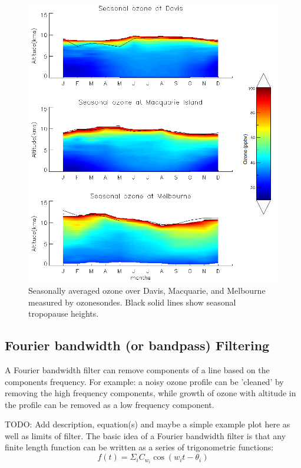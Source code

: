     \begin{figure}\begin{center}
      \includegraphics[width=0.8\columnwidth]{Figures/Ozone/seasonaltropozone}
      \caption{
	Seasonally averaged ozone over Davis, Macquarie, and Melbourne measured by ozonesondes.
	Black solid lines show seasonal tropopause heights.%
      }
      \label{ch_o3:fig:seasonaltropozone}
    \end{center}\end{figure}
    
  \subsection{Fourier bandwidth (or bandpass) Filtering}
    \label{ch_o3:sec:bandpassfilter}
    A Fourier bandwidth filter can remove components of a line based on the components frequency. 
    For example: a noisy ozone profile can be ’cleaned’ by removing the high frequency components, while growth of ozone with altitude in the profile can be removed as a low frequency component. 
    
    TODO: Add description, equation(s) and maybe a simple example plot here as well as limits of filter.
    The basic idea of a Fourier bandwidth filter is that any finite length function can be written as a series of trigonometric functions:
    \begin{equation} \label{ch_o3:eqn:FourierSeries}
      f(t) = \Sigma_i C_{w_i} \cos \left( w_i t - \theta_i \right)
    \end{equation}
    
